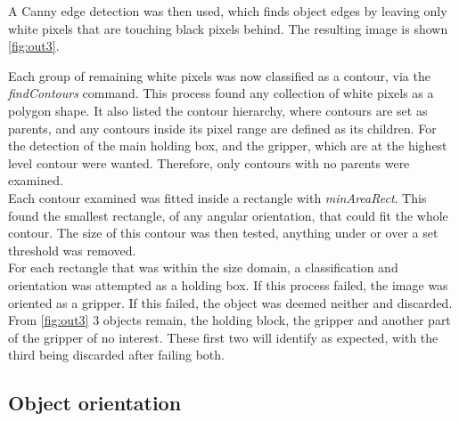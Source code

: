 \documentclass[11pt,a4paper]{report}
\begin{document}
A Canny edge detection was then used, which finds object edges by leaving only white pixels that are touching black pixels behind. The resulting image is shown \cref{fig:out3}.



Each group of remaining white pixels was now classified as a contour, via the \textit{findContours} command. This process found any collection of white pixels as a polygon shape. It also listed the contour hierarchy, where contours are set as parents, and any contours inside its pixel range are defined as its children. For the detection of the main holding box, and the gripper, which are at the highest level contour were wanted. Therefore, only contours with no parents were examined.\\

Each contour examined was fitted inside a rectangle with \textit{minAreaRect}. This found the smallest rectangle, of any angular orientation, that could fit the whole contour. The size of this contour was then tested, anything under or over a set threshold was removed.\\
For each rectangle that was within the size domain, a classification and orientation was attempted as a holding box. If this process failed, the image was oriented as a gripper. If this failed, the object was deemed neither and discarded. From \cref{fig:out3} 3 objects remain, the holding block, the gripper and another part of the gripper of no interest. These first two will identify as expected, with the third being discarded after failing both.   

\subsection{Object orientation}
\end{document}
